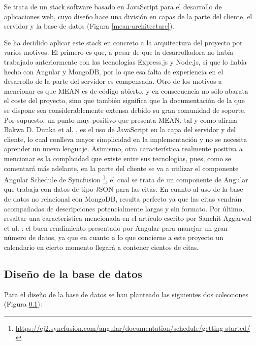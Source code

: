 Se trata de un stack software basado en JavaScript para el desarrollo de aplicaciones web, cuyo diseño hace una división en capas de la parte del cliente, el servidor y la base de datos (Figura \ref{mean-architecture}). \bigskip

Se ha decidido aplicar este stack en concreto a la arquitectura del proyecto por varios motivos. El primero es que, a pesar de que la desarrolladora no había trabajado anteriormente con las tecnologías Express.js y Node.js, sí que lo había hecho con Angular y MongoDB, por lo que esa falta de experiencia en el desarrollo de la parte del servidor es compensada. Otro de los motivos a mencionar es que MEAN es de código abierto, y en consecuencia no sólo abarata el coste del proyecto, sino que también significa que la documentación de la que se dispone sea considerablemente extensa debido su gran comunidad de soporte. Por supuesto, un punto muy positivo que presenta MEAN, tal y como afirma Bakwa D. Dunka et al. \cite{dunka2018simplifying}, es el uso de JavaScript en la capa del servidor y del cliente, lo cual conlleva mayor simplicidad en la implementación y no se necesita aprender un nuevo lenguaje. Asimismo, otra característica realmente positiva a mencionar es la complicidad que existe entre sus tecnologías, pues, como se comentará más adelante, en la parte del cliente se va a utilizar el componente Angular Schedule de Syncfusion \footnote{\url{https://ej2.syncfusion.com/angular/documentation/schedule/getting-started/}}, el cual se trata de un componente de Angular que trabaja con datos de tipo JSON para las citas. En cuanto al uso de la base de datos no relacional con MongoDB, resulta perfecto ya que las citas vendrán acompañadas de descripciones potencialmente largas y sin formato. Por último, resaltar una característica mencionada en el artículo escrito por Sanchit Aggarwal et al. \cite{aggarwal2018comparative}: el buen rendimiento presentado por Angular para manejar un gran número de datos, ya que en cuanto a lo que concierne a este proyecto un calendario en cierto momento llegará a contener cientos de citas.

\subsection{Diseño de la base de datos} \label{bd}

Para el diseño de la base de datos se han planteado las siguientes dos colecciones (Figura \ref{bd}):

